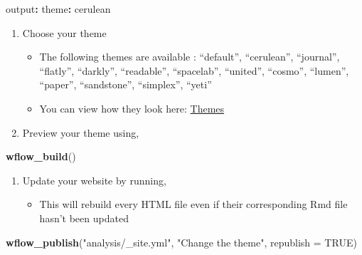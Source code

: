 \documentclass[openany]{book}
\newenvironment{Shaded}{\begin{snugshade}}{\end{snugshade}}
\newcommand{\DataTypeTok}[1]{\textcolor[rgb]{0.13,0.29,0.53}{#1}}
\newcommand{\KeywordTok}[1]{\textcolor[rgb]{0.13,0.29,0.53}{\textbf{#1}}}
\newcommand{\NormalTok}[1]{#1}
\newcommand{\OperatorTok}[1]{\textcolor[rgb]{0.81,0.36,0.00}{\textbf{#1}}}
\newcommand{\OtherTok}[1]{\textcolor[rgb]{0.56,0.35,0.01}{#1}}
\newcommand{\StringTok}[1]{\textcolor[rgb]{0.31,0.60,0.02}{#1}}
\providecommand{\tightlist}{%
  \setlength{\itemsep}{0pt}\setlength{\parskip}{0pt}}
\begin{document}
\begin{Shaded}
\begin{Highlighting}[]
\NormalTok{output}\OperatorTok{:}
\StringTok{    }\NormalTok{theme}\OperatorTok{:}\StringTok{ }\NormalTok{cerulean}
\end{Highlighting}
\end{Shaded}

\begin{enumerate}
\def\labelenumi{\arabic{enumi}.}
\setcounter{enumi}{2}
\tightlist
\item
  Choose your theme

  \begin{itemize}
  \tightlist
  \item
    The following themes are available : ``default'', ``cerulean'', ``journal'', ``flatly'', ``darkly'', ``readable'', ``spacelab'', ``united'', ``cosmo'', ``lumen'', ``paper'', ``sandstone'', ``simplex'', ``yeti''
  \item
    You can view how they look here: \href{https://bootswatch.com/}{Themes}
  \end{itemize}
\item
  Preview your theme using,
\end{enumerate}

\begin{Shaded}
\begin{Highlighting}[]
\KeywordTok{wflow_build}\NormalTok{()}
\end{Highlighting}
\end{Shaded}

\begin{enumerate}
\def\labelenumi{\arabic{enumi}.}
\setcounter{enumi}{4}
\tightlist
\item
  Update your website by running,

  \begin{itemize}
  \tightlist
  \item
    This will rebuild every HTML file even if their corresponding Rmd file hasn't been updated
  \end{itemize}
\end{enumerate}

\begin{Shaded}
\begin{Highlighting}[]
\KeywordTok{wflow_publish}\NormalTok{(}\StringTok{"analysis/_site.yml"}\NormalTok{, }\StringTok{"Change the theme"}\NormalTok{, }\DataTypeTok{republish =} \OtherTok{TRUE}\NormalTok{)}
\end{Highlighting}
\end{Shaded}
\end{document}
